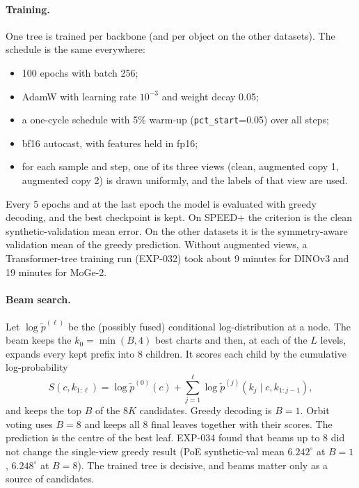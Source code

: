 \paragraph{Training.}\label{app:train}
One tree is trained per backbone (and per object on the other datasets). The schedule is the same everywhere:
\begin{itemize}
  \item 100 epochs with batch 256;
  \item AdamW with learning rate $10^{-3}$ and weight decay 0.05;
  \item a one-cycle schedule with 5\% warm-up (\texttt{pct\_start}=0.05) over all steps;
  \item bf16 autocast, with features held in fp16;
  \item for each sample and step, one of its three views (clean, augmented copy 1, augmented copy 2) is drawn uniformly, and the labels of that view are used.
\end{itemize}
Every 5 epochs and at the last epoch the model is evaluated with greedy decoding, and the best checkpoint is kept. On SPEED+ the criterion is the clean synthetic-validation mean error. On the other datasets it is the symmetry-aware validation mean of the greedy prediction. Without augmented views, a Transformer-tree training run (EXP-032) took about 9 minutes for DINOv3 and 19 minutes for MoGe-2.

\paragraph{Beam search.}
Let $\log\tilde p^{(\ell)}$ be the (possibly fused) conditional log-distribution at a node. The beam keeps the $k_0=\min(B,4)$ best charts and then, at each of the $L$ levels, expands every kept prefix into 8 children. It scores each child by the cumulative log-probability
\begin{equation}
  S(c,k_{1:\ell})=\log\tilde p^{(0)}(c)+\sum_{j=1}^{\ell}\log\tilde p^{(j)}(k_j\mid c,k_{1:j-1}),
\end{equation}
and keeps the top $B$ of the $8K$ candidates. Greedy decoding is $B=1$. Orbit voting uses $B=8$ and keeps all 8 final leaves together with their scores. The prediction is the centre of the best leaf. EXP-034 found that beams up to 8 did not change the single-view greedy result (PoE synthetic-val mean $6.242^\circ$ at $B{=}1$, $6.248^\circ$ at $B{=}8$). The trained tree is decisive, and beams matter only as a source of candidates.

